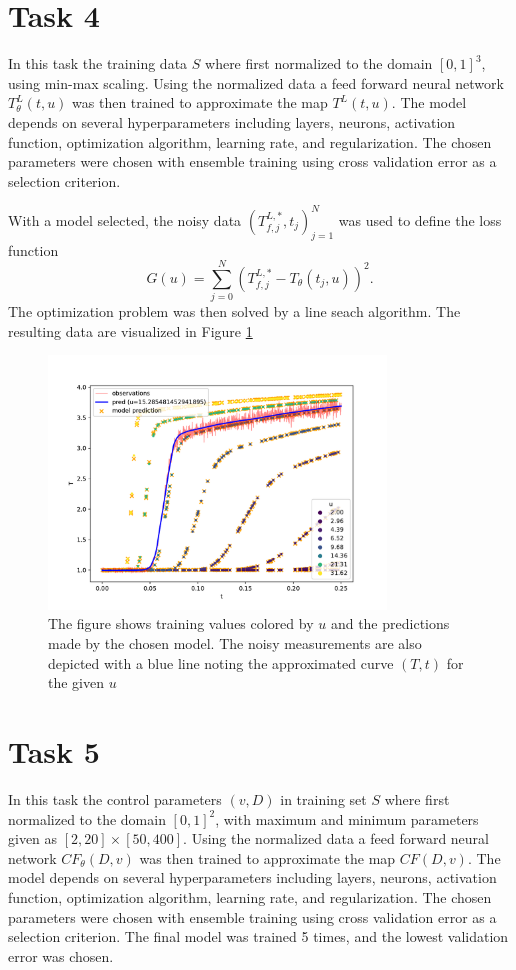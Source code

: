 \documentclass[a4paper]{article}
\begin{document}
\section*{Task 4}
In this task the training data $S$ where first normalized to the domain $[0,1]^3$, using min-max scaling. Using the normalized data a feed forward neural network $T^L_{\theta}(t, u)$ was then trained to approximate the map $T^L(t, u)$. The model depends on several hyperparameters including layers, neurons, activation function, optimization algorithm, learning rate, and regularization. The chosen parameters were chosen with ensemble training using cross validation error as a selection criterion.

With a model selected, the noisy data $(T_{f,j}^{L,*}, t_j)_{j=1}^{N}$ was used to define the loss function
\begin{equation}
	G(u) = \sum_{j=0}^{N}{(T_{f,j}^{L,*} - T_{\theta}(t_j,u))^2}.
\end{equation}
The optimization problem was then solved by a line seach algorithm. The resulting data are visualized in Figure \ref{fig:task4}
\begin{figure}[t]
    \centering
    \includegraphics[width=0.8\textwidth]{figures/task4/final.pdf}
    \caption{The figure shows training values colored by $u$ and the predictions made by the chosen model. The noisy measurements are also depicted with a blue line noting the approximated curve $(T,t)$ for the given $u$}
    \label{fig:task4}
\end{figure}

\section*{Task 5}
In this task the control parameters $(v,D)$ in training set $S$ where first normalized to the domain $[0,1]^2$,  with maximum and minimum parameters given as $[2,20]\times[50,400]$. Using the normalized data a feed forward neural network $CF_{\theta}(D, v)$ was then trained to approximate the map $CF(D, v)$. The model depends on several hyperparameters including layers, neurons, activation function, optimization algorithm, learning rate, and regularization. The chosen parameters were chosen with ensemble training using cross validation error as a selection criterion.  The final model was trained 5 times, and the lowest validation error was chosen. 
\end{document}
